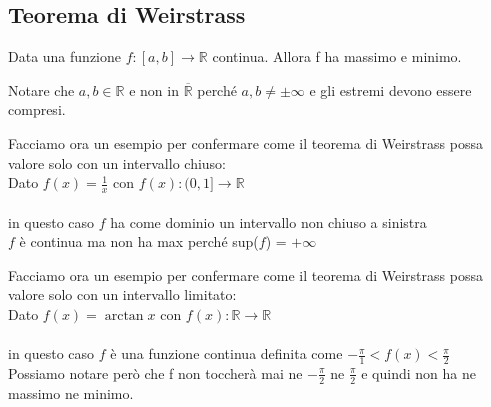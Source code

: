 \subsection{Teorema di Weirstrass}
\begin{theorem}
    Data una funzione $f: [a, b] \longrightarrow \mathbb{R}$ continua. Allora f ha massimo e minimo.
\end{theorem}
\begin{note}
    Notare che $a,b \in \mathbb{R}$ e non in $\overline{\mathbb{R}}$ perché $a, b \neq \pm \infty$ e gli estremi devono essere compresi.
\end{note}
\begin{example}
    Facciamo ora un esempio per confermare come il teorema di Weirstrass possa valore solo con un intervallo chiuso:\\
    Dato $f(x) = \frac{1}{x}$ con $f(x): (0, 1] \longrightarrow \mathbb{R}$ \\ \\in questo caso $f$ ha come dominio un intervallo non chiuso a sinistra\\
    $f$ è continua ma non ha max perché sup($f$) = $+\infty$
\end{example}
\begin{example}
    Facciamo ora un esempio per confermare come il teorema di Weirstrass possa valore solo con un intervallo limitato:\\
    Dato $f(x) = \arctan{x}$ con $f(x): \mathbb{R} \longrightarrow \mathbb{R}$ \\ \\in questo caso $f$ è una funzione continua definita come $-\frac{\pi}{1} < f(x) < \frac{\pi}{2}$\\
    Possiamo notare però che f non toccherà mai ne $-\frac{\pi}{2}$ ne $\frac{\pi}{2}$ e quindi non ha ne massimo ne minimo.
\end{example}